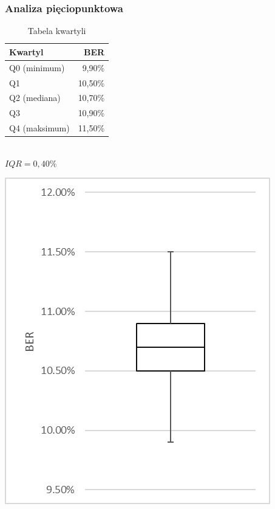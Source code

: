 \documentclass{article}
\begin{document}
		\subsubsection{Analiza pięciopunktowa}
			\begin{table}[h]
				\begin{minipage}{0.5\linewidth}
					\caption{Tabela kwartyli}
					\label{table:student}
					\centering
					\begin{tabular}{lr}
						\toprule
						Kwartyl						& BER \\
						\midrule
						Q0 (minimum)		& 9,90\% \\
						Q1    							& 10,50\% \\
						Q2 (mediana)  		& 10,70\% \\
						Q3   							& 10,90\% \\
						Q4 (maksimum)	& 11,50\% \\
						\bottomrule
					\end{tabular}\\\vspace{5mm}
					$IQR = 0,40\%$
				\end{minipage}
				\begin{minipage}{0.45\linewidth}
					\centering
					\includegraphics[width=0.8\linewidth]{img/five_64psk005.png}
					\label{ }
				\end{minipage}
			\end{table}
\end{document}
